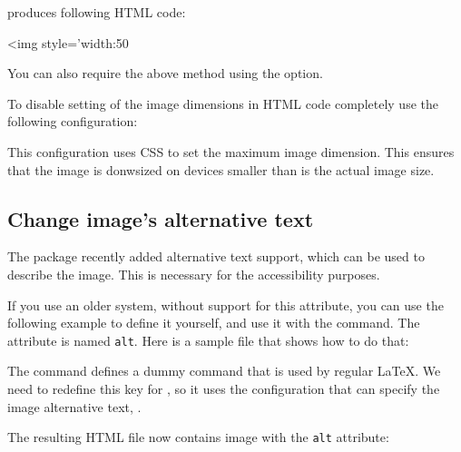 produces following HTML code:

\begin{htmlsource}
<img style='width:50%
\end{htmlsource}

You can also require the above method using the 
option.

To disable setting of the image dimensions in HTML code completely
use the following configuration:

\begin{texsource}

\EndPreamble
\end{texsource}

This configuration uses CSS to set the maximum image dimension. This ensures that
the image is donwsized on devices smaller than is the actual image size.


\subsection{Change image's alternative text}

The  package recently added alternative text support,
which can be used to describe the image. This is necessary
for the accessibility purposes.

If you use an older system, without support for this attribute, 
you can use the following example to define it yourself, and use it 
with the  command. The attribute is named 
\texttt{alt}. Here is a sample file that shows how to do that:


The  command defines a dummy command that
is used by regular \LaTeX. We need to redefine this key for \texfourht, so it uses the
configuration that can specify the image alternative text, .


The resulting HTML file now contains image with the \texttt{alt} attribute:

